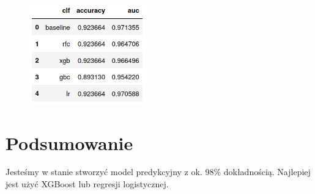 \documentclass{article}
\begin{document}
\begin{figure}[!ht]
\centering
\includegraphics[width=5cm]{zdjecia/tabela_droped.png}
\end{figure}

\section{Podsumowanie}

Jesteśmy w stanie stworzyć model predykcyjny z ok. 98\% dokładnością. Najlepiej jest użyć XGBoost lub regresji logistycznej. 
\end{document}
